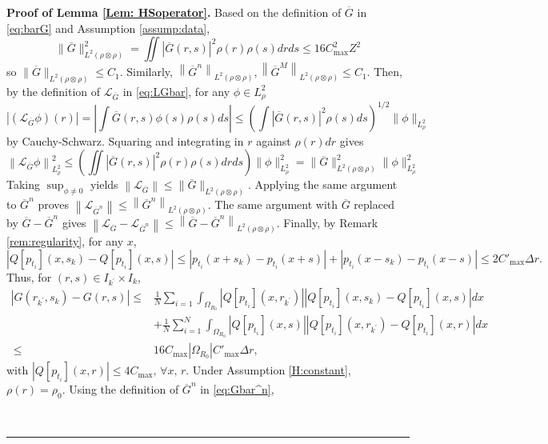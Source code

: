 \documentclass[12pt]{article}
\def\Gbar{ {\overline{G}} }
\newenvironment{proof}[1][Proof]{\noindent\textbf{#1.} }{\ \rule{0.5em}{0.5em}}
\numberwithin{equation}{section}
\numberwithin{theorem}{section}
\begin{document}
\begin{proof}[Proof of Lemma \ref{Lem: HSoperator}]
Based on the definition of $\Gbar$ in \eqref{eq:barG} and Assumption  \ref{assump:data},
$$
\|\Gbar\|_{L^2(\rho \otimes \rho)}^2=\iint\left|\Gbar(r,s)\right|^2 \rho(r) \rho(s) d r d s \leq  16 C_{\max }^2 Z^2
$$
so $\|\Gbar\|_{L^2(\rho \otimes \rho)} \leq C_1$. Similarly,  $\left\|\Gbar^n\right\|_{L^2(\rho \otimes \rho)}, \left\|\Gbar^{M} \right\|_{L^2(\rho \otimes \rho)} \leq C_1$. Then, by the definition of $\mathcal{L}_{\Gbar}$ in \eqref{eq:LGbar}, for any $\phi \in L_{\rho}^2$
$$
\left|\left(\mathcal{L}_{\Gbar} \phi\right)(r)\right|=\left|\int \Gbar(r, s) \phi(s) \rho(s) d s\right| \leq\left(\int|\Gbar(r, s)|^2 \rho(s) d s\right)^{1 / 2}\|\phi\|_{L_\rho^2}
$$
by Cauchy-Schwarz. Squaring and integrating in $r$ against $\rho(r) d r$ gives
$$
\left\|\mathcal{L}_{\Gbar} \phi\right\|_{L_\rho^2}^2 \leq\left(\iint|\Gbar(r, s)|^2 \rho(r) \rho(s) d r d s\right)\|\phi\|_{L_\rho^2}^2=\|\Gbar\|_{L^2(\rho \otimes \rho)}^2\|\phi\|_{L_\rho^2}^2
$$
Taking $\sup _{\phi \neq 0}$ yields $\left\|\mathcal{L}_{\Gbar}\right\| \leq\|\Gbar\|_{L^2(\rho \otimes \rho)}$. Applying the same argument to $\Gbar^n$ proves $\left\|\mathcal{L}_{\Gbar^n}\right\| \leq\left\|\Gbar^n\right\|_{L^2(\rho\otimes \rho)}$. The same argument with $\Gbar$ replaced by $\Gbar-\Gbar^n$ gives $\left\|\mathcal{L}_{\Gbar}-\mathcal{L}_{\Gbar^n}\right\| \leq\left\|\Gbar-\Gbar^n\right\|_{L^2(\rho \otimes \rho)}$. Finally, by Remark \ref{rem:regularity}, for any $x$,
$$
\left|Q\left[p_{t_i}\right]\left(x, s_k\right)-Q\left[p_{t_i}\right](x, s)\right| \leq\left|p_{t_i}\left(x+s_k\right)-p_{t_i}(x+s)\right|+\left|p_{t_i}\left(x-s_k\right)-p_{t_i}(x-s)\right| \leq 2C'_{\max}\Delta r.
$$
Thus, for $(r, s) \in I_{k^{'}} \times I_k$,
$$
\begin{aligned}
\left|G\left(r_{k^{'}}, s_k\right)-G(r, s)\right| \leq & \frac{1}{N} \sum_{i=1} \int_{\Omega_{R_0}}\left|Q\left[p_{t_i}\right]\left(x, r_{k^{'}}\right)\right|\left|Q\left[p_{t_i}\right]\left(x, s_k\right)-Q\left[p_{t_i}\right](x, s)\right| d x \\
& +\frac{1}{N} \sum_{i=1}^N \int_{\Omega_{R_0}}\left|Q\left[p_{t_i}\right](x, s)\right|\left|Q\left[p_{t_i}\right]\left(x, r_{k^{'}}\right)-Q\left[p_{t_i}\right](x, r)\right| d x \\
\
\leq & 16 C_{\max } \left|\Omega_{R_0}\right| C'_{\max} \Delta r,
\end{aligned}
$$
with $\left|Q\left[p_{t_i}\right]\left(x, r\right)\right| \leq 4 C_{\max} ,\, \forall  x,\,r$. Under Assumption \ref{H:constant}, $\rho(r) = \rho_0$. Using the definition of $\Gbar^n$ in \eqref{eq:Gbar^n},

\end{proof}
\end{document}
